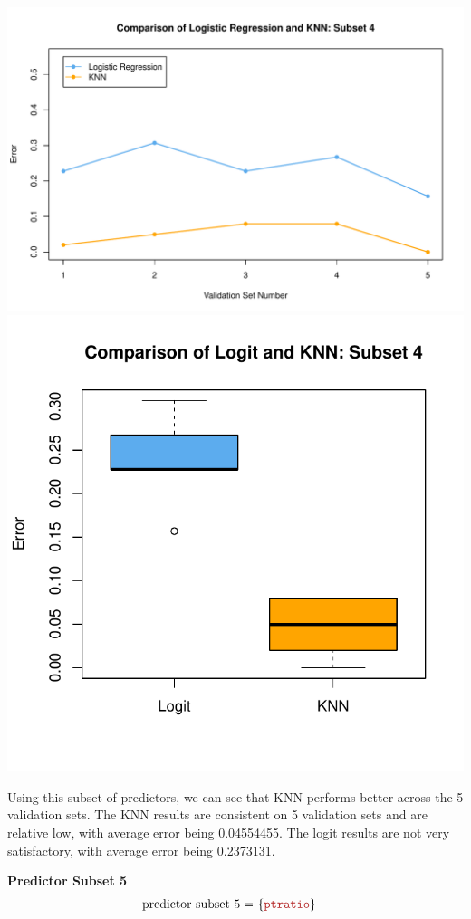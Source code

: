 \documentclass{article}
\begin{document}
\begin{center}
    \includegraphics[width=0.8\linewidth]{Images/Prob5/Prob5-13-Plot-Subset4.pdf}
    \includegraphics[width=0.45\linewidth]{Images/Prob5/Prob5-13-Boxplot-Subset4.pdf}
\end{center}

Using this subset of predictors, we can see that KNN performs better across the 5 validation sets. 
The KNN results are consistent on 5 validation sets and are relative low, with average error being 0.04554455.
The logit results are not very satisfactory, with average error being 0.2373131.
\bigskip




\noindent\textbf{Predictor Subset 5}
\[
    \begin{aligned}
    \text{predictor subset 5} =&\ 
    \{ 
        \feat{ptratio}
    \}
    \end{aligned}
\]
\end{document}
